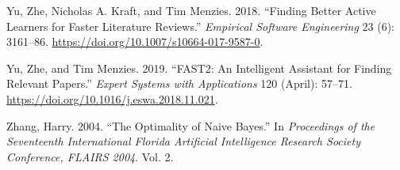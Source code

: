 \documentclass[
]{article}
\newlength{\cslhangindent}
\newenvironment{cslreferences}%
  {\setlength{\parindent}{0pt}%
  \everypar{\setlength{\hangindent}{\cslhangindent}}\ignorespaces}%
  {\par}
\begin{document}
\begin{cslreferences}
\leavevmode\hypertarget{ref-Yu2018a}{}%
Yu, Zhe, Nicholas A. Kraft, and Tim Menzies. 2018. ``Finding Better
Active Learners for Faster Literature Reviews.'' \emph{Empirical
Software Engineering} 23 (6): 3161--86.
\url{https://doi.org/10.1007/s10664-017-9587-0}.

\leavevmode\hypertarget{ref-Yu2019}{}%
Yu, Zhe, and Tim Menzies. 2019. ``FAST2: An Intelligent Assistant for
Finding Relevant Papers.'' \emph{Expert Systems with Applications} 120
(April): 57--71. \url{https://doi.org/10.1016/j.eswa.2018.11.021}.

\leavevmode\hypertarget{ref-Zhang2004}{}%
Zhang, Harry. 2004. ``The Optimality of Naive Bayes.'' In
\emph{Proceedings of the Seventeenth International Florida Artificial
Intelligence Research Society Conference, FLAIRS 2004}. Vol. 2.
\end{cslreferences}
\end{document}
